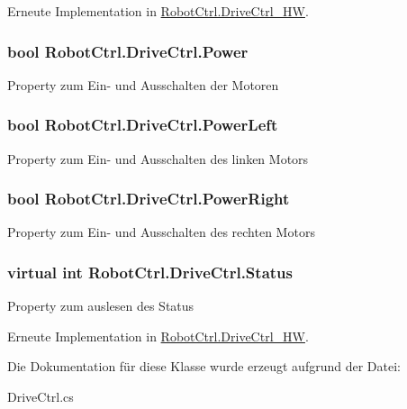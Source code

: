Erneute Implementation in \hyperlink{class_robot_ctrl_1_1_drive_ctrl___h_w_acc8cbfa5af4849ee85babc540ad63ada}{RobotCtrl.DriveCtrl\_\-HW}.

\hypertarget{class_robot_ctrl_1_1_drive_ctrl_aef1505229ec4f37b5cc69377360c3f2a}{
\subsubsection[{Power}]{\setlength{\rightskip}{0pt plus 5cm}bool RobotCtrl.DriveCtrl.Power}}
\label{class_robot_ctrl_1_1_drive_ctrl_aef1505229ec4f37b5cc69377360c3f2a}
Property zum Ein-\/ und Ausschalten der Motoren \hypertarget{class_robot_ctrl_1_1_drive_ctrl_af59bc9fd9c92f7bae49654588693673a}{
\subsubsection[{PowerLeft}]{\setlength{\rightskip}{0pt plus 5cm}bool RobotCtrl.DriveCtrl.PowerLeft}}
\label{class_robot_ctrl_1_1_drive_ctrl_af59bc9fd9c92f7bae49654588693673a}
Property zum Ein-\/ und Ausschalten des linken Motors \hypertarget{class_robot_ctrl_1_1_drive_ctrl_a7fa4a69b83012c16657c9f88a0637754}{
\subsubsection[{PowerRight}]{\setlength{\rightskip}{0pt plus 5cm}bool RobotCtrl.DriveCtrl.PowerRight}}
\label{class_robot_ctrl_1_1_drive_ctrl_a7fa4a69b83012c16657c9f88a0637754}
Property zum Ein-\/ und Ausschalten des rechten Motors \hypertarget{class_robot_ctrl_1_1_drive_ctrl_a462a4b74b24efb494df863d1ac249b45}{
\subsubsection[{Status}]{\setlength{\rightskip}{0pt plus 5cm}virtual int RobotCtrl.DriveCtrl.Status}}
\label{class_robot_ctrl_1_1_drive_ctrl_a462a4b74b24efb494df863d1ac249b45}
Property zum auslesen des Status 

Erneute Implementation in \hyperlink{class_robot_ctrl_1_1_drive_ctrl___h_w_ab77cfbe90640881ca1e051fab36f02ac}{RobotCtrl.DriveCtrl\_\-HW}.



Die Dokumentation für diese Klasse wurde erzeugt aufgrund der Datei:\begin{DoxyCompactItemize}
\item 
DriveCtrl.cs\end{DoxyCompactItemize}
